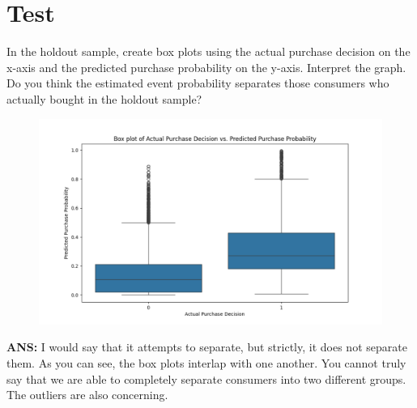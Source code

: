 \documentclass[a4paper,12pt]{article}
\begin{document}
\section{Test}
In the holdout sample, create box plots using the actual purchase decision on
the x-axis and the predicted purchase probability on the y-axis. Interpret the graph.
Do you think the estimated event probability separates those consumers who actually
bought in the holdout sample?
\begin{figure}[H]
\centering
\includegraphics[width=1\textwidth]{figure_1.png}
\label{Box Plots of Actual Purchase Decision and Predicted Purchase Probability}
\end{figure}
\textbf{ANS:} 
I would say that it attempts to separate, but strictly, it does not separate them.
As you can see, the box plots interlap with one another. You cannot truly say that we
are able to completely separate consumers into two different groups. The outliers
are also concerning. 
\end{document}
